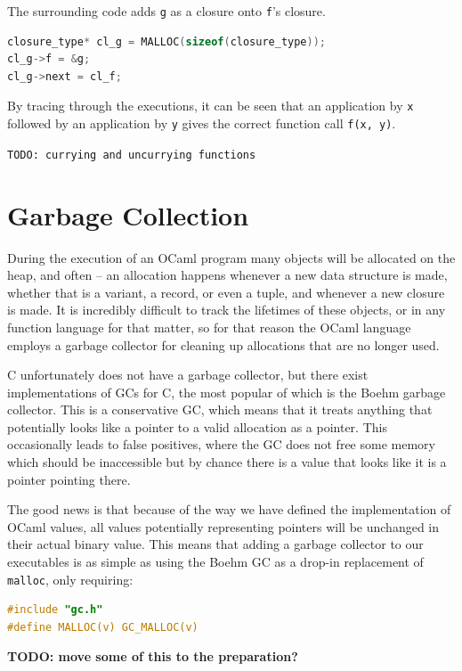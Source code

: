 \documentclass[12pt,a4paper,twoside,openright]{report}
\begin{document}
The surrounding code adds \texttt{g} as a closure onto \texttt{f}'s closure.

\begin{lstlisting}[language=C]
closure_type* cl_g = MALLOC(sizeof(closure_type));
cl_g->f = &g;
cl_g->next = cl_f;
\end{lstlisting}

By tracing through the executions, it can be seen that an application by 
\texttt{x} followed by an application by \texttt{y} gives the correct function 
call \texttt{f(x, y)}.

\texttt{TODO: currying and uncurrying functions}

\section{Garbage Collection} \label{gc}

During the execution of an OCaml program many objects will be allocated on the 
heap, and often -- an allocation happens whenever a new data structure is made, 
whether that is a variant, a record, or even a tuple, and whenever a new 
closure is made. It is incredibly difficult to track the lifetimes of these 
objects, or in any function language for that matter, so for that reason the 
OCaml language employs a garbage collector for cleaning up allocations that are 
no longer used.

C unfortunately does not have a garbage collector, but there exist 
implementations of GCs for C, the most popular of which is the Boehm garbage 
collector. This is a conservative GC, which means that it treats anything that 
potentially looks like a pointer to a valid allocation as a pointer. This 
occasionally leads to false positives, where the GC does not free some memory 
which should be inaccessible but by chance there is a value that looks like it 
is a pointer pointing there.

The good news is that because of the way we have defined the implementation of 
OCaml values, all values potentially representing pointers will be unchanged in 
their actual binary value. This means that adding a garbage collector to our 
executables is as simple as using the Boehm GC as a drop-in replacement of 
\texttt{malloc}, only requiring:

\begin{lstlisting}[language=C]
#include "gc.h"
#define MALLOC(v) GC_MALLOC(v)
\end{lstlisting}

\textbf{TODO: move some of this to the preparation?}
\end{document}
